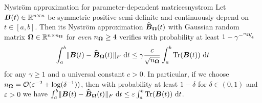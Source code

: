 \documentclass[12pt]{article}
\begin{document}
\begin{lemma}{Nyström approximation for parameter-dependent matrices}{nystrom}
    Let $\boldsymbol{B}(t) \in \mathbb{R}^{n \times n}$ be symmetric positive semi-definite and continuously depend on $t \in [a, b]$. Then its Nyström approximation $\widehat{\boldsymbol{B}}_{\boldsymbol{\Omega}}(t)$ with Gaussian random matrix $\boldsymbol{\Omega} \in \mathbb{R}^{n \times n_{\boldsymbol{\Omega}}}$ for \emph{even} $n_{\boldsymbol{\Omega}} \geq 4$ verifies with probability at least $1 - \gamma^{-{}^{n_{\boldsymbol{\Omega}}}{\mskip -5mu/\mskip -3mu}_{4}}$
    \begin{equation}
        \int_{a}^{b} \lVert \boldsymbol{B}(t) - \widehat{\boldsymbol{B}}_{\boldsymbol{\Omega}}(t) \rVert _F~\mathrm{d}t \leq \gamma \frac{c}{\sqrt{n_{\boldsymbol{\Omega}}}} \int_{a}^{b} \operatorname{Tr}(\boldsymbol{B}(t))~\mathrm{d}t
        \label{qu:nystrompp-theorem-bound}
    \end{equation}
    for any $\gamma \geq 1$ and a universal constant $c > 0$. In particular, if we choose $n_{\boldsymbol{\Omega}} = \mathcal{O}(\varepsilon^{-2} + \log(\delta^{-1}))$, then with probability at least $1-\delta$ for $\delta \in (0, 1)$ and $\varepsilon > 0$ we have $\int_{a}^{b} \lVert \boldsymbol{B}(t) - \widehat{\boldsymbol{B}}_{\boldsymbol{\Omega}}(t) \rVert _F~\mathrm{d}t \leq \varepsilon \int_{a}^{b} \operatorname{Tr}(\boldsymbol{B}(t))~\mathrm{d}t$.
\end{lemma}

\end{document}
